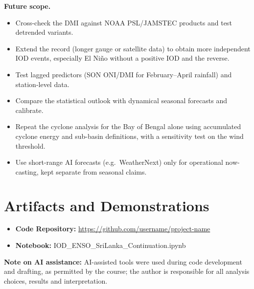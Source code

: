 \documentclass{article}
\begin{document}
\textbf{Future scope.}
\begin{itemize}[noitemsep]
    \item Cross-check the DMI against NOAA PSL/JAMSTEC products and test detrended variants.
    \item Extend the record (longer gauge or satellite data) to obtain more independent IOD events,
    especially El Ni\~{n}o without a positive IOD and the reverse.
    \item Test lagged predictors (SON ONI/DMI for February--April rainfall) and station-level data.
    \item Compare the statistical outlook with dynamical seasonal forecasts and calibrate.
    \item Repeat the cyclone analysis for the Bay of Bengal alone using accumulated cyclone energy
    and sub-basin definitions, with a sensitivity test on the wind threshold.
    \item Use short-range AI forecasts (e.g.\ WeatherNext) only for operational now-casting, kept
    separate from seasonal claims.
\end{itemize}

\section{Artifacts and Demonstrations}

\begin{itemize}[noitemsep]
    \item \textbf{Code Repository:} \url{https://github.com/username/project-name} %
    \item \textbf{Notebook:} IOD\_ENSO\_SriLanka\_Continuation.ipynb %
\end{itemize}

\textbf{Note on AI assistance:} AI-assisted tools were used during code development and drafting, as
permitted by the course; the author is responsible for all analysis choices, results and
interpretation. %

\vfill\pagebreak
{\fontsize{8}{9}\selectfont


}
\end{document}
